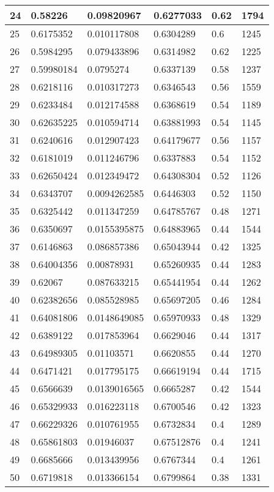 \begin{longtable}{|l|l|l|l|l|l|}
24 & 0.58226 & 0.09820967 & 0.6277033 & 0.62 & 1794 \\ \hline 
25 & 0.6175352 & 0.010117808 & 0.6304289 & 0.6 & 1245 \\ \hline 
26 & 0.5984295 & 0.079433896 & 0.6314982 & 0.62 & 1225 \\ \hline 
27 & 0.59980184 & 0.0795274 & 0.6337139 & 0.58 & 1237 \\ \hline 
28 & 0.6218116 & 0.010317273 & 0.6346543 & 0.56 & 1559 \\ \hline 
29 & 0.6233484 & 0.012174588 & 0.6368619 & 0.54 & 1189 \\ \hline 
30 & 0.62635225 & 0.010594714 & 0.63881993 & 0.54 & 1145 \\ \hline 
31 & 0.6240616 & 0.012907423 & 0.64179677 & 0.56 & 1157 \\ \hline 
32 & 0.6181019 & 0.011246796 & 0.6337883 & 0.54 & 1152 \\ \hline 
33 & 0.62650424 & 0.012349472 & 0.64308304 & 0.52 & 1126 \\ \hline 
34 & 0.6343707 & 0.0094262585 & 0.6446303 & 0.52 & 1150 \\ \hline 
35 & 0.6325442 & 0.011347259 & 0.64785767 & 0.48 & 1271 \\ \hline 
36 & 0.6350697 & 0.0155395875 & 0.64883965 & 0.44 & 1544 \\ \hline 
37 & 0.6146863 & 0.086857386 & 0.65043944 & 0.42 & 1325 \\ \hline 
38 & 0.64004356 & 0.00878931 & 0.65260935 & 0.44 & 1283 \\ \hline 
39 & 0.62067 & 0.087633215 & 0.65441954 & 0.44 & 1262 \\ \hline 
40 & 0.62382656 & 0.085528985 & 0.65697205 & 0.46 & 1284 \\ \hline 
41 & 0.64081806 & 0.0148649085 & 0.65970933 & 0.48 & 1329 \\ \hline 
42 & 0.6389122 & 0.017853964 & 0.6629046 & 0.44 & 1317 \\ \hline 
43 & 0.64989305 & 0.01103571 & 0.6620855 & 0.44 & 1270 \\ \hline 
44 & 0.6471421 & 0.017795175 & 0.66619194 & 0.44 & 1715 \\ \hline 
45 & 0.6566639 & 0.0139016565 & 0.6665287 & 0.42 & 1544 \\ \hline 
46 & 0.65329933 & 0.016223118 & 0.6700546 & 0.42 & 1323 \\ \hline 
47 & 0.66229326 & 0.010761955 & 0.6732834 & 0.4 & 1289 \\ \hline 
48 & 0.65861803 & 0.01946037 & 0.67512876 & 0.4 & 1241 \\ \hline 
49 & 0.6685666 & 0.013439956 & 0.6767344 & 0.4 & 1261 \\ \hline 
50 & 0.6719818 & 0.013366154 & 0.6799864 & 0.38 & 1331 \\ \hline 
\end{longtable}